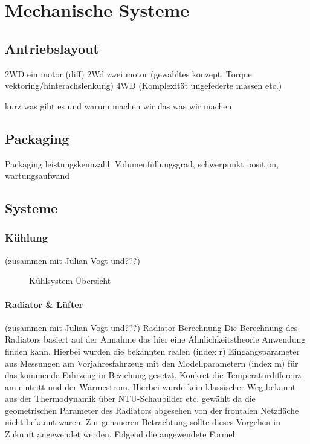 
\chapter{Mechanische Systeme}

\section{Antriebslayout}
2WD ein motor (diff)
2Wd zwei motor (gewähltes konzept, Torque vektoring/hinterachslenkung)
4WD (Komplexität ungefederte massen etc.)

kurz was gibt es und warum machen wir das was wir machen

\section{Packaging}
Packaging leistungskennzahl. Volumenfüllungsgrad, schwerpunkt position, wartungsaufwand

\section{Systeme}

\subsection{Kühlung} (zusammen mit Julian Vogt und???)

\begin{figure}[H]
	\centering
	
	\caption{Kühlsystem Übersicht}
	\label{abb:Coolingssystem}
\end{figure}


\subsubsection{Radiator \& Lüfter} (zusammen mit Julian Vogt und???)
Radiator Berechnung
Die Berechnung des Radiators basiert auf der Annahme das hier eine Ähnlichkeitstheorie Anwendung finden kann. Hierbei wurden die bekannten realen (index r) Eingangsparameter aus Messungen am Vorjahresfahrzeug mit den Modellparametern (index m) für das kommende Fahrzeug in Beziehung gesetzt. Konkret die Temperaturdifferenz am eintritt und der Wärmestrom. Hierbei wurde kein klassischer Weg bekannt aus der Thermodynamik über NTU-Schaubilder etc. gewählt da die geometrischen Parameter des Radiators abgesehen von der frontalen Netzfläche nicht bekannt waren. Zur genaueren Betrachtung sollte dieses Vorgehen in Zukunft angewendet werden. Folgend die angewendete Formel.

